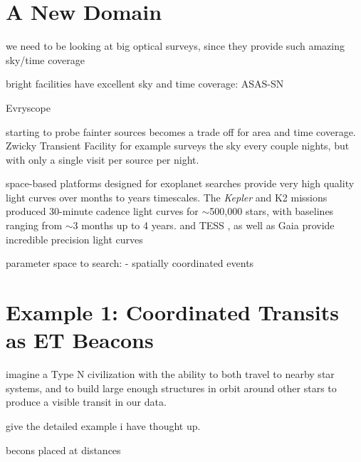 \documentclass[modern]{aastex62}
\newcommand{\Kepler}{\textsl{Kepler}\xspace}
\begin{document}


\section{A New Domain}
we need to be looking at big optical surveys, since they provide such amazing sky/time coverage

bright facilities have excellent sky and time coverage:
ASAS-SN \citep{kochanek2017}

Evryscope \citep{law2015}

starting to probe fainter sources becomes a trade off for area and time coverage.
Zwicky Transient Facility \citep{bellm2014}
for example surveys the sky every couple nights, but with only a single visit per source per night.


space-based platforms designed for exoplanet searches provide very high quality light curves over months to years timescales. The \Kepler and K2 missions \citep{borucki2010,howell2014} produced 30-minute cadence light curves for $\sim$500,000 stars, with baselines ranging from $\sim$3 months up to 4 years. 
and TESS \citep{tess}, as well as Gaia \citep{gaia} provide incredible precision light curves



parameter space to search:
- spatially coordinated events



\section{Example 1: Coordinated Transits as ET Beacons}
imagine a Type N civilization with the ability to both travel to nearby star systems, and to build large enough structures in orbit around other stars to produce a visible transit in our data.

give the detailed example i have thought up.

becons placed at distances
\end{document}
